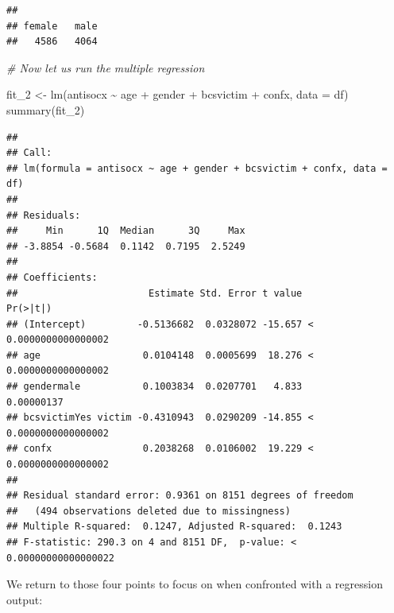 \documentclass[
]{book}
\newenvironment{Shaded}{\begin{snugshade}}{\end{snugshade}}
\newcommand{\AttributeTok}[1]{\textcolor[rgb]{0.77,0.63,0.00}{#1}}
\newcommand{\CommentTok}[1]{\textcolor[rgb]{0.56,0.35,0.01}{\textit{#1}}}
\newcommand{\FunctionTok}[1]{\textcolor[rgb]{0.00,0.00,0.00}{#1}}
\newcommand{\NormalTok}[1]{#1}
\newcommand{\OtherTok}[1]{\textcolor[rgb]{0.56,0.35,0.01}{#1}}
\newcommand{\SpecialCharTok}[1]{\textcolor[rgb]{0.00,0.00,0.00}{#1}}
\begin{document}
\begin{verbatim}
## 
## female   male 
##   4586   4064
\end{verbatim}

\begin{Shaded}
\begin{Highlighting}[]
\CommentTok{\# Now let us run the multiple regression}

\NormalTok{fit\_2 }\OtherTok{\textless{}{-}} \FunctionTok{lm}\NormalTok{(antisocx }\SpecialCharTok{\textasciitilde{}}\NormalTok{ age }\SpecialCharTok{+}\NormalTok{ gender }\SpecialCharTok{+}\NormalTok{ bcsvictim }\SpecialCharTok{+}\NormalTok{ confx, }\AttributeTok{data =}\NormalTok{ df)}
\FunctionTok{summary}\NormalTok{(fit\_2)}
\end{Highlighting}
\end{Shaded}

\begin{verbatim}
## 
## Call:
## lm(formula = antisocx ~ age + gender + bcsvictim + confx, data = df)
## 
## Residuals:
##     Min      1Q  Median      3Q     Max 
## -3.8854 -0.5684  0.1142  0.7195  2.5249 
## 
## Coefficients:
##                       Estimate Std. Error t value             Pr(>|t|)
## (Intercept)         -0.5136682  0.0328072 -15.657 < 0.0000000000000002
## age                  0.0104148  0.0005699  18.276 < 0.0000000000000002
## gendermale           0.1003834  0.0207701   4.833           0.00000137
## bcsvictimYes victim -0.4310943  0.0290209 -14.855 < 0.0000000000000002
## confx                0.2038268  0.0106002  19.229 < 0.0000000000000002
## 
## Residual standard error: 0.9361 on 8151 degrees of freedom
##   (494 observations deleted due to missingness)
## Multiple R-squared:  0.1247, Adjusted R-squared:  0.1243 
## F-statistic: 290.3 on 4 and 8151 DF,  p-value: < 0.00000000000000022
\end{verbatim}

We return to those four points to focus on when confronted with a regression output:
\end{document}
